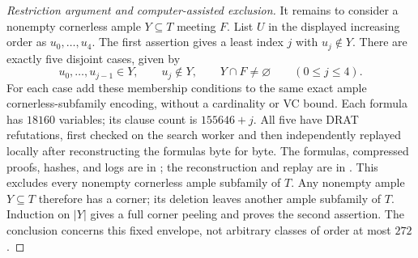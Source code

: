 \documentclass[11pt]{article}
\numberwithin{equation}{section}
\theoremstyle{definition}
\theoremstyle{remark}
\begin{document}
\begin{proof}[Restriction argument and computer-assisted exclusion]
It remains to consider a nonempty cornerless ample $Y\subseteq T$
meeting $F$. List $U$ in the displayed increasing order as
$u_0,\ldots,u_4$. The first assertion gives a least index $j$ with
$u_j\notin Y$. There are exactly five disjoint cases, given by
\[
 u_0,\ldots,u_{j-1}\in Y,\qquad u_j\notin Y,\qquad
 Y\cap F\ne\varnothing \qquad(0\le j\le4).
\]
For each case add these membership conditions to the same exact ample
cornerless-subfamily encoding, without a cardinality or VC bound.
Each formula has $18160$ variables; its clause count is $155646+j$.
All five have DRAT refutations, first checked on the search worker and
then independently replayed locally after reconstructing the formulas
byte for byte. The formulas, compressed proofs, hashes, and logs are in
; the reconstruction and replay
are in .
This excludes every nonempty cornerless ample subfamily of $T$.
Any nonempty ample $Y\subseteq T$ therefore has a corner; its deletion
leaves another ample subfamily of $T$. Induction on $|Y|$ gives a full
corner peeling and proves the second assertion. The conclusion concerns
this fixed envelope, not arbitrary classes of order at most $272$.
\end{proof}
\end{document}
